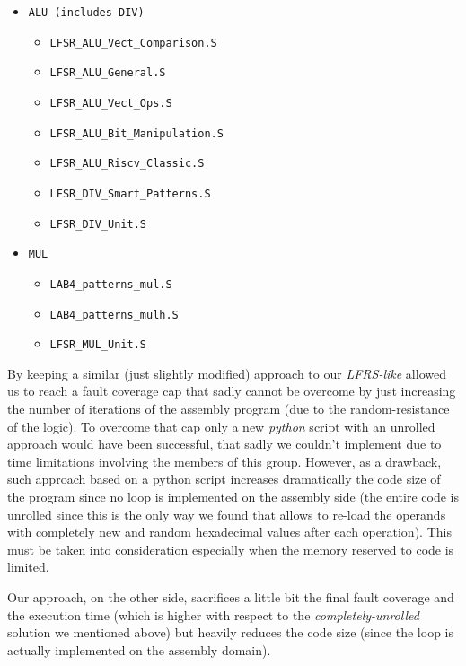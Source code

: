 \documentclass{article}
\begin{document}
\begin{itemize}
    \item \texttt{ALU (includes \texttt{DIV})}
    \begin{itemize}
        \item \texttt{LFSR\_ALU\_Vect\_Comparison.S}
        \item \texttt{LFSR\_ALU\_General.S}
        \item \texttt{LFSR\_ALU\_Vect\_Ops.S}
        \item \texttt{LFSR\_ALU\_Bit\_Manipulation.S}
        \item \texttt{LFSR\_ALU\_Riscv\_Classic.S}
        \item \texttt{LFSR\_DIV\_Smart\_Patterns.S}
        \item \texttt{LFSR\_DIV\_Unit.S}
    \end{itemize}
    \item \texttt{MUL}
    \begin{itemize}
        \item \texttt{LAB4\_patterns\_mul.S}
        \item \texttt{LAB4\_patterns\_mulh.S}
        \item \texttt{LFSR\_MUL\_Unit.S}
    \end{itemize}
\end{itemize}

By keeping a similar (just slightly modified) approach to our \emph{LFRS-like} allowed us to reach a fault coverage cap that sadly cannot be overcome by just increasing the number of iterations of the assembly program (due to the random-resistance of the logic).
To overcome that cap only a new \emph{python} script with an unrolled approach would have been successful, that sadly we couldn't implement due to time limitations involving the members of this group.
However, as a drawback, such approach based on a python script increases dramatically the code size of the program since no loop is implemented on the assembly side (the entire code is unrolled since this is the only way we found that allows to re-load the operands with completely new and random hexadecimal values after each operation). This must be taken into consideration especially when the memory reserved to code is limited.

Our approach, on the other side, sacrifices a little bit the final fault coverage and the execution time (which is higher with respect to the \emph{completely-unrolled} solution we mentioned above) but heavily reduces the code size (since the loop is actually implemented on the assembly domain).
\end{document}
